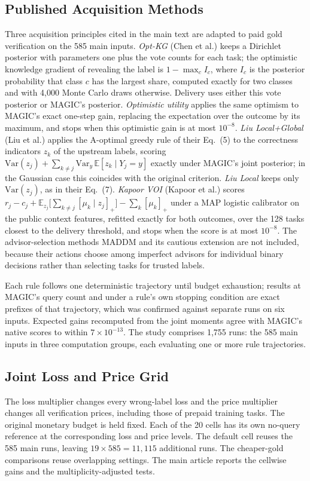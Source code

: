 \documentclass[journal]{IEEEtran}
\newcommand{\E}{\mathbb{E}}
\newcommand{\pos}[1]{[#1]_+}
\begin{document}
\subsection{Published Acquisition Methods}
Three acquisition principles cited in the main text are adapted to paid gold verification on the 585 main inputs. \emph{Opt-KG} (Chen et al.) keeps a Dirichlet posterior with parameters one plus the vote counts for each task; the optimistic knowledge gradient of revealing the label is $1-\max_c I_c$, where $I_c$ is the posterior probability that class $c$ has the largest share, computed exactly for two classes and with 4,000 Monte Carlo draws otherwise. Delivery uses either this vote posterior or MAGIC's posterior. \emph{Optimistic utility} applies the same optimism to MAGIC's exact one-step gain, replacing the expectation over the outcome by its maximum, and stops when this optimistic gain is at most $10^{-8}$. \emph{Liu Local+Global} (Liu et al.) applies the A-optimal greedy rule of their Eq.~(5) to the correctness indicators $z_k$ of the upstream labels, scoring $\mathrm{Var}(z_j)+\sum_{k\ne j}\mathrm{Var}_{y}\,\E[z_k\mid Y_j=y]$ exactly under MAGIC's joint posterior; in the Gaussian case this coincides with the original criterion. \emph{Liu Local} keeps only $\mathrm{Var}(z_j)$, as in their Eq.~(7). \emph{Kapoor VOI} (Kapoor et al.) scores $r_j-c_j+\E_{z_j}\big[\sum_{k\ne j}\pos{\mu_k\mid z_j}\big]-\sum_k\pos{\mu_k}$ under a MAP logistic calibrator on the public context features, refitted exactly for both outcomes, over the 128 tasks closest to the delivery threshold, and stops when the score is at most $10^{-8}$. The advisor-selection methods MADDM and its cautious extension are not included, because their actions choose among imperfect advisors for individual binary decisions rather than selecting tasks for trusted labels.

Each rule follows one deterministic trajectory until budget exhaustion; results at MAGIC's query count and under a rule's own stopping condition are exact prefixes of that trajectory, which was confirmed against separate runs on six inputs. Expected gains recomputed from the joint moments agree with MAGIC's native scores to within $7\times10^{-13}$. The study comprises 1,755 runs: the 585 main inputs in three computation groups, each evaluating one or more rule trajectories.

\subsection{Joint Loss and Price Grid}
The loss multiplier changes every wrong-label loss and the price multiplier changes all verification prices, including those of prepaid training tasks. The original monetary budget is held fixed. Each of the 20 cells has its own no-query reference at the corresponding loss and price levels. The default cell reuses the 585 main runs, leaving $19\times585=11{,}115$ additional runs. The cheaper-gold comparisons reuse overlapping settings. The main article reports the cellwise gains and the multiplicity-adjusted tests.
\end{document}
